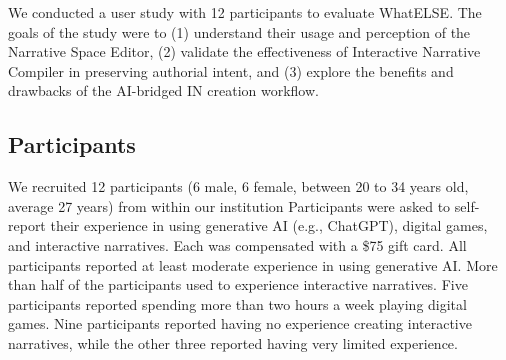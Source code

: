 \label{sec:user_study}

We conducted a user study with 12 participants to evaluate {\sc WhatELSE}. The goals of the study were to (1) understand their usage and perception of the Narrative Space Editor, (2) validate the effectiveness of Interactive Narrative Compiler in preserving authorial intent, and (3) explore the benefits and drawbacks of the AI-bridged IN creation workflow.

\subsection{Participants}
We recruited 12 participants (6 male, 6 female, between 20 to 34 years old, average 27 years) from within our institution 
Participants were asked to self-report their experience in using generative AI (e.g., ChatGPT), digital games, and interactive narratives. Each was compensated with a \$75 gift card. All participants reported at least moderate experience in using generative AI. More than half of the participants used to experience interactive narratives. Five participants reported spending more than two hours a week playing digital games. 
Nine participants reported having no experience creating interactive narratives, while the other three reported having very limited experience.

